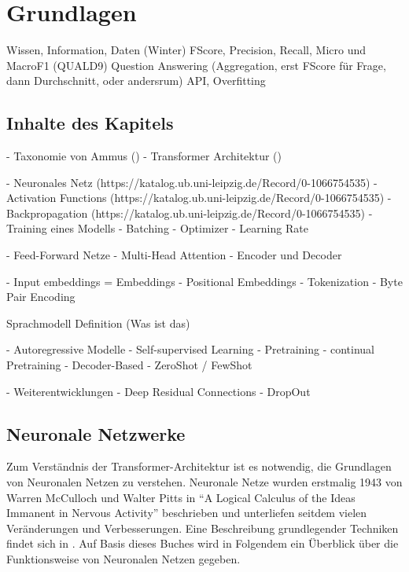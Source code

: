 \chapter{Grundlagen}\label{ch:preliminaries}

Wissen, Information, Daten (Winter)
FScore, Precision, Recall, Micro und MacroF1 (QUALD9)
Question Answering (Aggregation, erst FScore für Frage, dann Durchschnitt, oder andersrum)
API, Overfitting


\section*{Inhalte des Kapitels}
- Taxonomie von Ammus (\citet{ammus})
- Transformer Architektur (\citet{attention})

- Neuronales Netz (https://katalog.ub.uni-leipzig.de/Record/0-1066754535)
- Activation Functions (https://katalog.ub.uni-leipzig.de/Record/0-1066754535)
- Backpropagation (https://katalog.ub.uni-leipzig.de/Record/0-1066754535)
- Training eines Modells
    - Batching
    - Optimizer
    - Learning Rate

- Feed-Forward Netze
- Multi-Head Attention
- Encoder und Decoder

- Input embeddings = Embeddings
- Positional Embeddings
- Tokenization
    - Byte Pair Encoding


Sprachmodell Definition (Was ist das)

- Autoregressive Modelle
    - Self-supervised Learning
    - Pretraining
    - continual Pretraining
    - Decoder-Based
    - ZeroShot / FewShot

- Weiterentwicklungen
    - Deep Residual Connections
    - DropOut


\section{Neuronale Netzwerke}
Zum Verständnis der Transformer-Architektur ist es notwendig, die Grundlagen von Neuronalen Netzen zu verstehen.
Neuronale Netze wurden erstmalig 1943 von Warren McCulloch und Walter Pitts in \enquote{A Logical Calculus of the Ideas Immanent in Nervous Activity} beschrieben und unterliefen seitdem vielen Veränderungen und Verbesserungen. Eine Beschreibung grundlegender Techniken findet sich in \citet{neuronale-netze}. Auf Basis dieses Buches wird in Folgendem ein Überblick über die Funktionsweise von Neuronalen Netzen gegeben.\\

